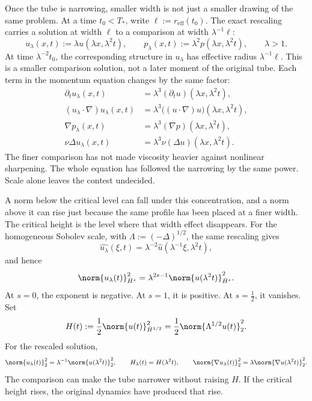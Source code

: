 
Once the tube is narrowing, smaller width is not just a smaller drawing of the same problem.
At a time \(t_0<T_*\), write \(\ell:=r_{\mathrm{eff}}(t_0)\).
The exact \NavierStokes{} rescaling carries a solution at width \(\ell\) to a comparison at width \(\lambda^{-1}\ell\):
\[
  u_\lambda(x,t)
  :=
  \lambda u(\lambda x,\lambda^2t),
  \qquad
  p_\lambda(x,t)
  :=
  \lambda^2p(\lambda x,\lambda^2t),
  \qquad
  \lambda>1.
\]
At time \(\lambda^{-2}t_0\), the corresponding structure in \(u_\lambda\) has effective radius \(\lambda^{-1}\ell\).
This is a smaller comparison solution, not a later moment of the original tube.
Each term in the momentum equation changes by the same factor:
\[
\begin{aligned}
  \partial_tu_\lambda(x,t)
  &=
  \lambda^3(\partial_tu)(\lambda x,\lambda^2t),
  \\
  (u_\lambda\cdot\nabla)u_\lambda(x,t)
  &=
  \lambda^3\bigl((u\cdot\nabla)u\bigr)(\lambda x,\lambda^2t),
  \\
  \nabla p_\lambda(x,t)
  &=
  \lambda^3(\nabla p)(\lambda x,\lambda^2t),
  \\
  \nu\Delta u_\lambda(x,t)
  &=
  \lambda^3\nu(\Delta u)(\lambda x,\lambda^2t).
\end{aligned}
\]
The finer comparison has not made viscosity heavier against nonlinear sharpening.
The whole equation has followed the narrowing by the same power.
Scale alone leaves the contest undecided.


A norm below the critical level can fall under this concentration, and a norm above it can rise just because the same profile has been placed at a finer width.
The critical height is the level where that width effect disappears.
For the homogeneous Sobolev scale, with \(\Lambda:=(-\Delta)^{1/2}\), the same rescaling gives
\[
  \widehat{u_\lambda}(\xi,t)
  =
  \lambda^{-2}\widehat u(\lambda^{-1}\xi,\lambda^2t),
\]
and hence
\[
  \norm{u_\lambda(t)}_{\dot H^s}^2
  =
  \lambda^{2s-1}
  \norm{u(\lambda^2t)}_{\dot H^s}^2.
\]
At \(s=0\), the exponent is negative.
At \(s=1\), it is positive.
At \(s=\tfrac12\), it vanishes.
Set
\[
  H(t)
  :=
  \frac12\norm{u(t)}_{\dot H^{1/2}}^2
  =
  \frac12\norm{\Lambda^{1/2}u(t)}_2^2.
\]
For the rescaled solution,
\[
  \norm{u_\lambda(t)}_2^2
  =
  \lambda^{-1}\norm{u(\lambda^2t)}_2^2,
  \qquad
  H_\lambda(t)=H(\lambda^2t),
  \qquad
  \norm{\nabla u_\lambda(t)}_2^2
  =
  \lambda\norm{\nabla u(\lambda^2t)}_2^2.
\]
The comparison can make the tube narrower without raising \(H\).
If the critical height rises, the original dynamics have produced that rise.

